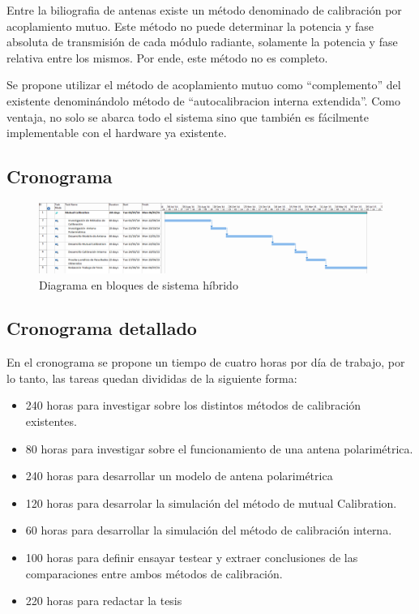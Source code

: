 \documentclass[a4paper,10pt]{article}
\begin{document}
Entre la biliografia de antenas existe un método denominado de calibración por 
acoplamiento mutuo. Este método no puede
determinar la potencia y fase absoluta de transmisión de cada módulo radiante, 
solamente la potencia y fase relativa entre los mismos. Por ende, este método no
es completo.

Se propone utilizar el método de acoplamiento mutuo como “complemento” del 
existente denominándolo método de “autocalibracion interna extendida”. Como 
ventaja, no solo se abarca todo el sistema sino que también es fácilmente 
implementable con el hardware ya existente. 

\thispagestyle{lscape}
\begin{landscape}
 
    \section{Cronograma}
	
\begin{figure}[!htb]
 \centering
 \includegraphics[width=1.5\textwidth]{Imagenes/CronogramaTesis.png}
 \caption{Diagrama en bloques de sistema híbrido}
 \label{fig:sist_hibrido}
\end{figure}

    \end{landscape}
\restoregeometry
       
    \subsection{Cronograma detallado}

En el cronograma se propone un tiempo de cuatro horas por día de trabajo, por lo tanto, las tareas quedan divididas de la siguiente forma:

\begin{itemize}
    \item 240 horas para investigar sobre los distintos métodos de calibración existentes.
    \item 80 horas para investigar sobre el funcionamiento de una antena polarimétrica.
    \item 240 horas para desarrollar un modelo de antena polarimétrica
    \item 120 horas para desarrolar la simulación del método de mutual Calibration.
    \item 60 horas para desarrollar la simulación del método de calibración interna.
    \item 100 horas para definir ensayar testear y extraer conclusiones de las comparaciones entre ambos métodos de calibración.
    \item 220 horas para redactar la tesis
\end{itemize}
\end{document}
